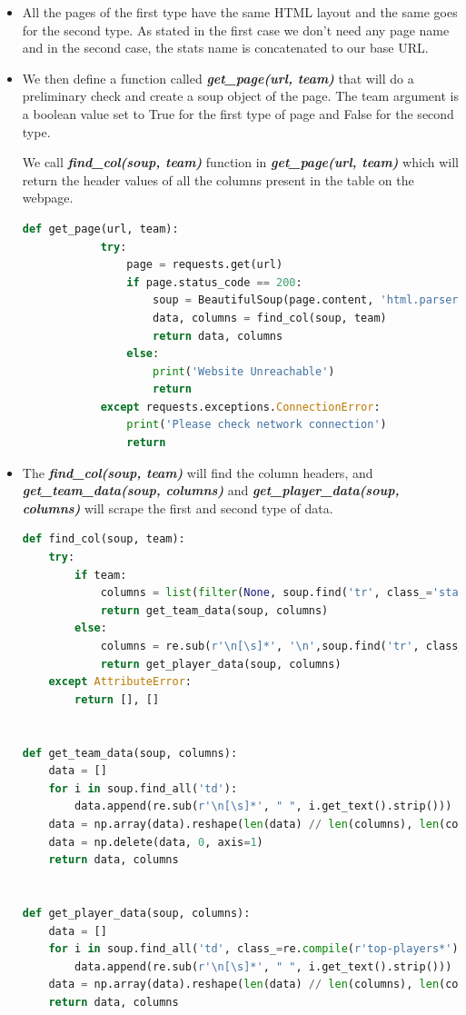 \documentclass[12pt]{article}
\begin{document}
\begin{itemize}
	\item All the pages of the first type have the same HTML layout and the same goes for the second type. As stated in the first case we don’t need any page name and in the second case, the stats name is concatenated to our base URL.
	\item We then define a function called \textbf{\textit{get\_page(url, team)}} that will do a preliminary check and create a soup object of the page. The team argument is a boolean value set to True for the first type of page and False for the second type.
	
	We call \textbf{\textit{find\_col(soup, team)}} function in \textbf{\textit{get\_page(url, team)}} which will return the header values of all the columns present in the table on the webpage.
	\begin{lstlisting}[language=Python]
		def get_page(url, team):
			try:
				page = requests.get(url)
				if page.status_code == 200:
					soup = BeautifulSoup(page.content, 'html.parser')
					data, columns = find_col(soup, team)
					return data, columns
				else:
					print('Website Unreachable')
					return
			except requests.exceptions.ConnectionError:
				print('Please check network connection')
				return
	\end{lstlisting}
	\item The \textbf{\textit{find\_col(soup, team)}} will find the column headers, and \textbf{\textit{get\_team\_data(soup, columns)}} and \textbf{\textit{get\_player\_data(soup, columns)}} will scrape the first and second type of data.
	
	\begin{lstlisting}[language=Python]
def find_col(soup, team):
	try:
		if team:
			columns = list(filter(None, soup.find('tr', class_='standings-table__header').get_text().split('\n')))
			return get_team_data(soup, columns)
		else:
			columns = re.sub(r'\n[\s]*', '\n',soup.find('tr', class_=re.compile(r'top-players__header*')).get_text()).strip().split('\n')
			return get_player_data(soup, columns)
	except AttributeError:
		return [], []
	
	
def get_team_data(soup, columns):
	data = []
	for i in soup.find_all('td'):
		data.append(re.sub(r'\n[\s]*', " ", i.get_text().strip()))
	data = np.array(data).reshape(len(data) // len(columns), len(columns) + 1)
	data = np.delete(data, 0, axis=1)
	return data, columns
	
	
def get_player_data(soup, columns):
	data = []
	for i in soup.find_all('td', class_=re.compile(r'top-players*')):
		data.append(re.sub(r'\n[\s]*', " ", i.get_text().strip()))
	data = np.array(data).reshape(len(data) // len(columns), len(columns))
	return data, columns
	\end{lstlisting}
	

\end{itemize}
\end{document}

